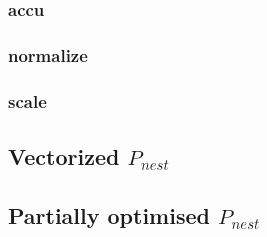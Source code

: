 \documentclass{article}
\newcommand{\ndpn}[0]{$P_{nest}$}
\begin{document}
        
        
      \subsubsection{accu}
        
        
        
      \subsubsection{normalize}
        
        
        
      \subsubsection{scale}
        
        
      
    \subsection{Vectorized \ndpn }
      
      
  
    \subsection{Partially optimised \ndpn}
      
      
  
  
  \newpage
  
  
  
\end{document}
